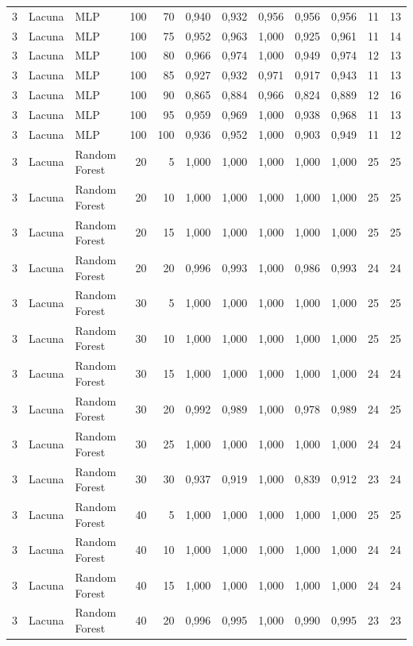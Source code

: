 \begin{longtable}{@{}rllrrrrrrrrr@{}}
3 & Lacuna & MLP & 100 & 70 & 0,940 & 0,932 & 0,956 & 0,956 & 0,956 & 11 & 13 \\
3 & Lacuna & MLP & 100 & 75 & 0,952 & 0,963 & 1,000 & 0,925 & 0,961 & 11 & 14 \\
3 & Lacuna & MLP & 100 & 80 & 0,966 & 0,974 & 1,000 & 0,949 & 0,974 & 12 & 13 \\
3 & Lacuna & MLP & 100 & 85 & 0,927 & 0,932 & 0,971 & 0,917 & 0,943 & 11 & 13 \\
3 & Lacuna & MLP & 100 & 90 & 0,865 & 0,884 & 0,966 & 0,824 & 0,889 & 12 & 16 \\
3 & Lacuna & MLP & 100 & 95 & 0,959 & 0,969 & 1,000 & 0,938 & 0,968 & 11 & 13 \\
3 & Lacuna & MLP & 100 & 100 & 0,936 & 0,952 & 1,000 & 0,903 & 0,949 & 11 & 12 \\
3 & Lacuna & Random Forest & 20 & 5 & 1,000 & 1,000 & 1,000 & 1,000 & 1,000 & 25 & 25 \\
3 & Lacuna & Random Forest & 20 & 10 & 1,000 & 1,000 & 1,000 & 1,000 & 1,000 & 25 & 25 \\
3 & Lacuna & Random Forest & 20 & 15 & 1,000 & 1,000 & 1,000 & 1,000 & 1,000 & 25 & 25 \\
3 & Lacuna & Random Forest & 20 & 20 & 0,996 & 0,993 & 1,000 & 0,986 & 0,993 & 24 & 24 \\
3 & Lacuna & Random Forest & 30 & 5 & 1,000 & 1,000 & 1,000 & 1,000 & 1,000 & 25 & 25 \\
3 & Lacuna & Random Forest & 30 & 10 & 1,000 & 1,000 & 1,000 & 1,000 & 1,000 & 25 & 25 \\
3 & Lacuna & Random Forest & 30 & 15 & 1,000 & 1,000 & 1,000 & 1,000 & 1,000 & 24 & 24 \\
3 & Lacuna & Random Forest & 30 & 20 & 0,992 & 0,989 & 1,000 & 0,978 & 0,989 & 24 & 25 \\
3 & Lacuna & Random Forest & 30 & 25 & 1,000 & 1,000 & 1,000 & 1,000 & 1,000 & 24 & 24 \\
3 & Lacuna & Random Forest & 30 & 30 & 0,937 & 0,919 & 1,000 & 0,839 & 0,912 & 23 & 24 \\
3 & Lacuna & Random Forest & 40 & 5 & 1,000 & 1,000 & 1,000 & 1,000 & 1,000 & 25 & 25 \\
3 & Lacuna & Random Forest & 40 & 10 & 1,000 & 1,000 & 1,000 & 1,000 & 1,000 & 24 & 24 \\
3 & Lacuna & Random Forest & 40 & 15 & 1,000 & 1,000 & 1,000 & 1,000 & 1,000 & 24 & 24 \\
3 & Lacuna & Random Forest & 40 & 20 & 0,996 & 0,995 & 1,000 & 0,990 & 0,995 & 23 & 23 \\

\end{longtable}
